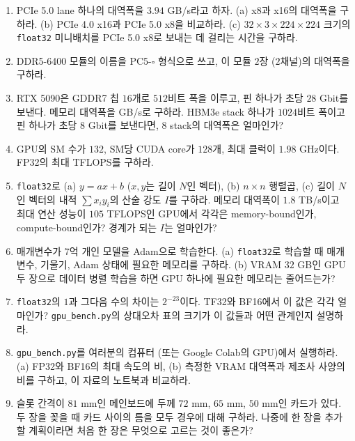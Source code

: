 \documentclass[11pt,a4paper]{article}
\begin{document}
\begin{enumerate}[label=\arabic*.]

\item PCIe 5.0 lane 하나의 대역폭을 $3.94$ GB/s라고 하자. (a) x8과 x16의 대역폭을 구하라. (b) PCIe 4.0 x16과 PCIe 5.0 x8을 비교하라.
(c) $32\times3\times224\times224$ 크기의 \texttt{float32} 미니배치를 PCIe 5.0 x8로 보내는 데 걸리는 시간을 구하라.

\item DDR5-6400 모듈의 이름을 PC5-$\square$ 형식으로 쓰고, 이 모듈 $2$장 ($2$채널)의 대역폭을 구하라.

\item RTX 5090은 GDDR7 칩 $16$개로 $512$비트 폭을 이루고, 핀 하나가 초당 $28$ Gbit를 보낸다. 메모리 대역폭을 GB/s로 구하라.
HBM3e stack 하나가 $1024$비트 폭이고 핀 하나가 초당 $8$ Gbit를 보낸다면, $8$ stack의 대역폭은 얼마인가?

\item GPU의 SM 수가 $132$, SM당 CUDA core가 $128$개, 최대 클럭이 $1.98$ GHz이다. FP32의 최대 TFLOPS를 구하라.

\item \texttt{float32}로 (a) $y=ax+b$ ($x,y$는 길이 $N$인 벡터), (b) $n\times n$ 행렬곱, (c) 길이 $N$인 벡터의 내적 $\sum x_iy_i$의 산술 강도 $I$를 구하라.
메모리 대역폭이 $1.8$ TB/s이고 최대 연산 성능이 $105$ TFLOPS인 GPU에서 각각은 memory-bound인가, compute-bound인가? 경계가 되는 $I$는 얼마인가?

\item 매개변수가 $7$억 개인 모델을 Adam으로 학습한다. (a) \texttt{float32}로 학습할 때 매개변수, 기울기, Adam 상태에 필요한 메모리를 구하라.
(b) VRAM $32$ GB인 GPU 두 장으로 데이터 병렬 학습을 하면 GPU 하나에 필요한 메모리는 줄어드는가?

\item \texttt{float32}의 $1$과 그다음 수의 차이는 $2^{-23}$이다. TF32와 BF16에서 이 값은 각각 얼마인가?
\texttt{gpu\_bench.py}의 상대오차 표의 크기가 이 값들과 어떤 관계인지 설명하라.

\item \texttt{gpu\_bench.py}를 여러분의 컴퓨터 (또는 Google Colab의 GPU)에서 실행하라.
(a) FP32와 BF16의 최대 속도의 비, (b) 측정한 VRAM 대역폭과 제조사 사양의 비를 구하고, 이 자료의 노트북과 비교하라.

\item 슬롯 간격이 $81$ mm인 메인보드에 두께 $72$ mm, $65$ mm, $50$ mm인 카드가 있다. 두 장을 꽂을 때 카드 사이의 틈을 모두 경우에 대해 구하라.
나중에 한 장을 추가할 계획이라면 처음 한 장은 무엇으로 고르는 것이 좋은가?


\end{enumerate}
\end{document}
